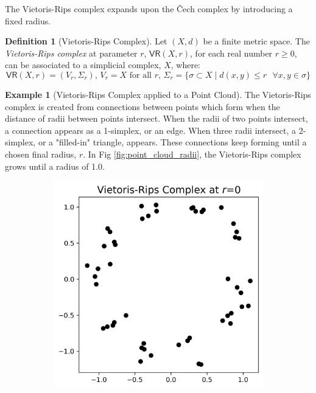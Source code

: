 \documentclass[ma]{uncgdissertationexp}
\theoremstyle{plain}
\theoremstyle{definition}
\newtheorem{definition}[theorem]{Definition}
\newtheorem{example}[theorem]{Example}
\theoremstyle{remark}
\begin{document}
\par The Vietoris-Rips complex expands upon the Čech complex by introducing a fixed radius.

\begin{definition}[Vietoris-Rips Complex]
Let $(X, d)$ be a finite metric space. The \textit{Vietoris-Rips complex} at parameter $r$, $\mathsf{VR}(X, r)$, for each real number $r\geq0$, can be associated to a simplicial complex, $X$, where:
$$\mathsf{VR}(X, r) = (V_{r}, \Sigma_{r})\text{, }V_{r}=X\text{ for all }r\text{, }\Sigma_{r} = \{\sigma \subset X \mid d(x,y) \leq r\text{ }\forall x, y \in \sigma\}$$
\end{definition}

\newpage 
\begin{example}[Vietoris-Rips Complex applied to a Point Cloud]
\par The Vietoris-Rips complex is created from connections between points which form when the distance of radii between points intersect. When the radii of two points intersect, a connection appears as a 1-simplex, or an edge. When three radii intersect, a 2-simplex, or a "filled-in" triangle, appears. These connections keep forming until a chosen final radius, $r$. In Fig \ref{fig:point_cloud_radii}, the Vietoris-Rips complex grows until a radius of 1.0.
\begin{figure}[H]
    \centering
    \begin{subfigure}[b]{0.22\textwidth}
        \centering
        \includegraphics[width=\textwidth]{point_cloud_plot_r0.png}

\end{subfigure}
\end{figure}
\end{example}
\end{document}
